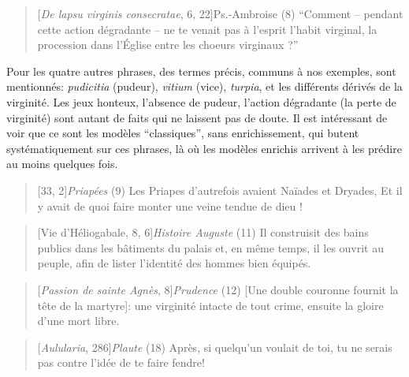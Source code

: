 \begin{quote}[\textit{De lapsu virginis consecratae}, 6, 22]{Ps.-Ambroise}
	(8) ``Comment – pendant cette action dégradante – ne te venait pas à l’esprit l’habit virginal, la procession dans l’Église entre les choeurs virginaux ?''
\end{quote}

Pour les quatre autres phrases, des termes précis, communs à nos exemples, sont mentionnés: \textit{pudicitia} (pudeur), \textit{vitium} (vice), \textit{turpia}, et les différents dérivés de la virginité. Les jeux honteux, l'absence de pudeur, l'action dégradante (la perte de virginité) sont autant de faits qui ne laissent pas de doute. Il est intéressant de voir que ce sont les modèles ``classiques'', sans enrichissement, qui butent systématiquement sur ces phrases, là où les modèles enrichis arrivent à les prédire au moins quelques fois.

\starbreak

\begin{quote}[33, 2]{\textit{Priapées}}
    (9) Les Priapes d’autrefois avaient Naïades et Dryades, Et il y avait de quoi faire monter une veine tendue de dieu !
\end{quote}

\begin{quote}[Vie d'Héliogabale, 8, 6]{\textit{Histoire Auguste}}
    (11) Il construisit des bains publics dans les bâtiments du palais et, en même temps, il les ouvrit au peuple, afin de lister l'identité des hommes bien équipés.
\end{quote}
\begin{quote}[\textit{Passion de sainte Agnès}, 8]{\textit{Prudence}}
    (12) [Une double couronne fournit la tête de la martyre]: une virginité intacte de tout crime, ensuite la gloire d'une mort libre.
\end{quote}
\begin{quote}[\textit{Aulularia}, 286]{\textit{Plaute}}
    (18) Après, si quelqu’un voulait de toi, tu ne serais pas contre l'idée de te faire fendre!
\end{quote}


